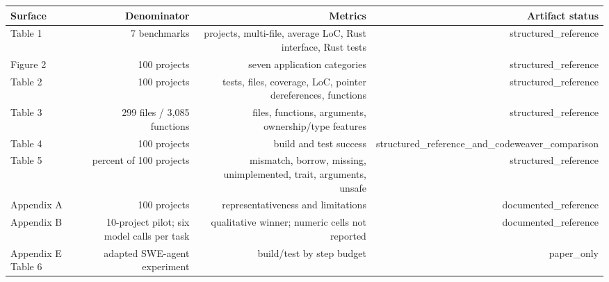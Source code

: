 \documentclass{article}
\begin{document}
\begin{tabular}{lrrr}
\toprule
Surface & Denominator & Metrics & Artifact status \\
\midrule
Table 1 & 7 benchmarks & projects, multi-file, average LoC, Rust interface, Rust tests & structured\_reference \\
Figure 2 & 100 projects & seven application categories & structured\_reference \\
Table 2 & 100 projects & tests, files, coverage, LoC, pointer dereferences, functions & structured\_reference \\
Table 3 & 299 files / 3,085 functions & files, functions, arguments, ownership/type features & structured\_reference \\
Table 4 & 100 projects & build and test success & structured\_reference\_and\_codeweaver\_comparison \\
Table 5 & percent of 100 projects & mismatch, borrow, missing, unimplemented, trait, arguments, unsafe & structured\_reference \\
Appendix A & 100 projects & representativeness and limitations & documented\_reference \\
Appendix B & 10-project pilot; six model calls per task & qualitative winner; numeric cells not reported & documented\_reference \\
Appendix E Table 6 & adapted SWE-agent experiment & build/test by step budget & paper\_only \\
\bottomrule
\end{tabular}
\end{document}
